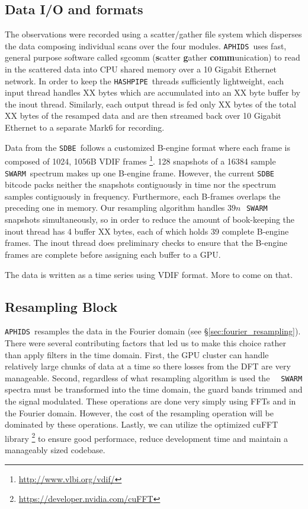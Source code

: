 \documentclass[11pt,preprint]{aastex}
\newcommand{\SWARM}[1]{\texttt{#1\,SWARM}}
\newcommand{\SDBE}{\texttt{SDBE}}
\newcommand{\APHIDS}{\texttt{APHIDS}}
\newcommand{\HASHPIPE}{\texttt{HASHPIPE}}
\begin{document}
\subsection{Data I/O and formats}

The observations were recorded using a scatter/gather file system which disperses the 
data composing individual scans over the four modules.  \APHIDS\, uses fast, general purpose software called 
sgcomm (\textbf{s}catter \textbf{g}ather \textbf{comm}unication) to read in 
the scattered data into CPU shared memory over a 10 Gigabit Ethernet network.  In order to keep the \HASHPIPE\, 
threads sufficiently lightweight, each input thread handles XX bytes which are accumulated into an XX byte 
buffer by the inout thread.  Similarly, each output thread is fed only XX bytes of the total XX bytes of the 
resamped data and are then streamed back over 10 Gigabit Ethernet to a separate Mark6 for recording.

Data from the \SDBE\, follows a customized B-engine format where each
frame is composed of 1024, 1056B VDIF frames \footnote{\url{http://www.vlbi.org/vdif/}}.  128 snapshots of a 
16384 sample \SWARM{}\, spectrum makes up one B-engine frame. However, the current \SDBE\, bitcode packs
neither the snapshots contiguously in time nor the spectrum samples contiguously in frequency.  Furthermore, 
each B-frames overlaps the preceding one in memory.  Our resampling algorithm handles $39n$\,\SWARM{}\, snapshots
simultaneously, so in order to reduce the amount of book-keeping the inout thread has 4 buffer XX bytes, 
each of which holds 39 complete B-engine frames.  The inout thread does preliminary checks to ensure that the 
B-engine frames are complete before assigning each buffer to a GPU.

The data is written as a time series using VDIF format.  More to come on that.

\subsection{Resampling Block}\label{sec:resamp_block}

\APHIDS\, resamples the data in the Fourier domain (see \S \ref{sec:fourier_resampling}).  There were several 
contributing factors that led us to make
this choice rather than apply filters in the time domain.  First, the GPU cluster can handle relatively large 
chunks of data at a time so there losses from the DFT are very manageable.  Second, regardless of 
what resampling algorithm is used the \SWARM\, spectra must 
be transformed into the time domain, the guard bands trimmed and the signal modulated.  These operations are done 
very simply using FFTs and in the Fourier domain.  However, the cost of the
resampling operation will be dominated by these operations.  Lastly, we can utilize the optimized cuFFT library
\footnote{\url{https://developer.nvidia.com/cuFFT}} to ensure good performace, reduce development time and 
maintain a manageably sized codebase.
\end{document}

